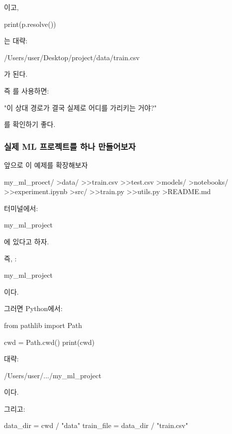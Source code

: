 이고,

\begin{dhkcode}
print(p.resolve())
\end{dhkcode}

는 대략:

\begin{dhkzsh}
/Users/user/Desktop/project/data/train.csv
\end{dhkzsh}

가 된다.

즉 를 사용하면:
\begin{dhksmry}[centered]
"이 상대 경로가 결국 실제로 어디를 가리키는 거야?"
\end{dhksmry}

를 확인하기 좋다.

\subsubsection{실제 ML 프로젝트를 하나 만들어보자}

앞으로 이 예제를 확장해보자

\begin{dhkdir}[in=10]
my_ml_proect/
>data/
>>train.csv
>>test.csv
>models/
>notebooks/
>>experiment.ipynb
>src/
>>train.py
>>utils.py
>README.md
\end{dhkdir}

터미널에서:

\begin{dhkzsh}
my_ml_project %
\end{dhkzsh}

에 있다고 하자.

즉, :

\begin{dhkzsh}
my_ml_project
\end{dhkzsh}

이다.

그러면 Python에서:

\begin{dhkcode}
from pathlib import Path

cwd = Path.cwd()
print(cwd)
\end{dhkcode}

대략:

\begin{dhkzsh}
/Users/user/.../my_ml_project
\end{dhkzsh}

이다.

그리고:

\begin{dhkcode}
data_dir = cwd / "data"
train_file = data_dir / "train.csv"
\end{dhkcode}

